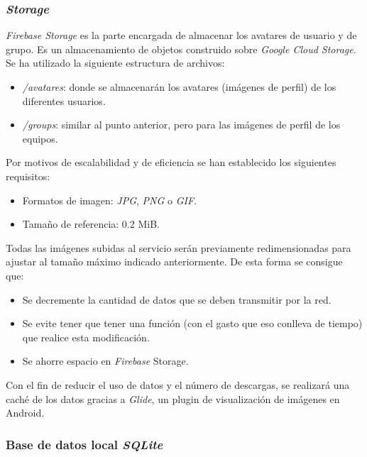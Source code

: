 \documentclass[twoside]{report}
\begin{document}
\subsubsection{\textit{Storage}}

\textit{Firebase Storage} es la parte encargada de almacenar los avatares de usuario y de grupo. Es un almacenamiento de objetos construido sobre \textit{Google Cloud Storage}. \\

Se ha utilizado la siguiente estructura de archivos:
\begin{itemize}

\item \textit{/avatares}: donde se almacenarán los avatares (imágenes de perfil) de los diferentes usuarios. 

\item \textit{/groups}: similar al punto anterior, pero para las imágenes de perfil de los equipos. 

\end{itemize}

Por motivos de escalabilidad y de eficiencia se han establecido los siguientes requisitos:
\begin{itemize}
\item Formatos de imagen: \textit{JPG}, \textit{PNG} o \textit{GIF}.
\item Tamaño de referencia: 0.2 MiB.
\end{itemize}

Todas las imágenes subidas al servicio serán previamente redimensionadas para ajustar al tamaño máximo indicado anteriormente. De esta forma se consigue que:

\begin{itemize}
\item Se decremente la cantidad de datos que se deben transmitir por la red.
\item Se evite tener que tener una función (con el gasto que eso conlleva de tiempo) que realice esta modificación.
\item Se ahorre espacio en \textit{Firebase} Storage.
\end{itemize}

Con el fin de reducir el uso de datos y el número de descargas, se realizará una caché de los datos gracias a \textit{Glide}, un plugin de visualización de imágenes en Android.

\subsubsection{Base de datos local \textit{SQLite}}
\end{document}
